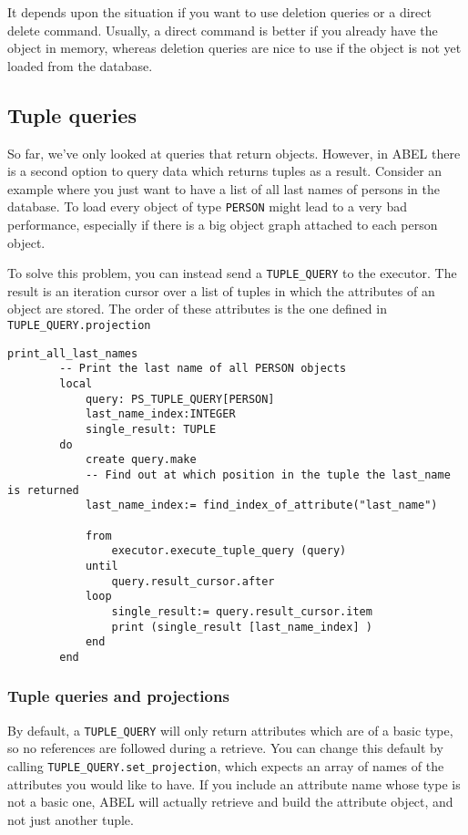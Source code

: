 It depends upon the situation if you want to use deletion queries or a direct delete command. 
Usually, a direct command is better if you already have the object in memory, whereas deletion queries are nice to use if the object is not yet loaded from the database.

\subsection{Tuple queries}

So far, we've only looked at queries that return objects. However, in ABEL there is a second option to query data which returns tuples as a result.
Consider an example where you just want to have a list of all last names of persons in the database. 
To load every object of type \lstinline!PERSON! might lead to a very bad performance, especially if there is a big object graph attached to each person object.

To solve this problem, you can instead send a \lstinline!TUPLE_QUERY! to the executor. 
The result is an iteration cursor over a list of tuples in which the attributes of an object are stored. The order of these attributes is the one defined in \lstinline!TUPLE_QUERY.projection!

\begin{lstlisting}[language=OOSC2Eiffel, captionpos=b, caption={}, label={lst:tuple_query_simple}]
	print_all_last_names
		-- Print the last name of all PERSON objects
		local
			query: PS_TUPLE_QUERY[PERSON]
			last_name_index:INTEGER
			single_result: TUPLE
		do
			create query.make
			-- Find out at which position in the tuple the last_name is returned
			last_name_index:= find_index_of_attribute("last_name")

			from
				executor.execute_tuple_query (query)
			until
				query.result_cursor.after
			loop
				single_result:= query.result_cursor.item
				print (single_result [last_name_index] )
			end			
		end
\end{lstlisting}

\subsubsection{Tuple queries and projections}
By default, a \lstinline!TUPLE_QUERY! will only return attributes which are of a basic type, so no references are followed during a retrieve.
You can change this default by calling \lstinline!TUPLE_QUERY.set_projection!, which expects an array of names of the attributes you would like to have.
If you include an attribute name whose type is not a basic one, ABEL will actually retrieve and build the attribute object, and not just another tuple.

